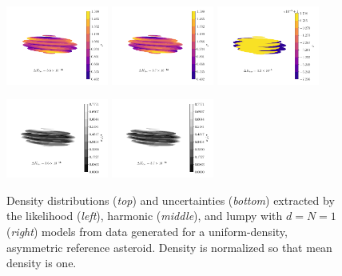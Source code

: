\documentclass[fleqn,usenatbib]{mnras}
\begin{document}
\begin{figure}
  \centering
  \includegraphics[width=0.3\textwidth]{figs/asym-ell-likelihood.pdf}\hfill
  \includegraphics[width=0.3\textwidth]{figs/asym-ell-harmonic.pdf}\hfill
  \includegraphics[width=0.3\textwidth]{figs/asym-ell-lumpy.pdf}


  \includegraphics[width=0.3\textwidth]{figs/asym-ell-unc-likelihood.pdf}\hfill
  \includegraphics[width=0.3\textwidth]{figs/asym-ell-unc-harmonic.pdf}\hfill\hspace{0.3\textwidth}


  \caption{Density distributions (\textit{top}) and uncertainties (\textit{bottom}) extracted by the likelihood (\textit{left}), harmonic (\textit{middle}), and lumpy with $d=N=1$ (\textit{right}) models from data generated for a uniform-density, asymmetric reference asteroid. Density is normalized so that mean density is one.}
  \label{fig:uniform-density-results}
\end{figure}
\end{document}
